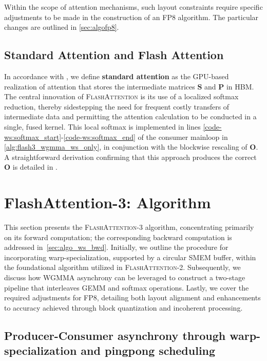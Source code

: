 Within the scope of attention mechanisms, such layout constraints require specific adjustments to be made in the construction of an FP8 algorithm. The particular changes are outlined in \cref{sec:algofp8}.

\subsection{Standard Attention and Flash Attention} In accordance with \citet{dao2022flashattention}, we define \textbf{standard attention} as the GPU-based realization of attention that stores the intermediate matrices $\mathbf{S}$ and $\mathbf{P}$ in HBM. The central innovation of \textsc{FlashAttention} is its use of a localized softmax reduction, thereby sidestepping the need for frequent costly transfers of intermediate data and permitting the attention calculation to be conducted in a single, fused kernel. This local softmax is implemented in lines \ref{code-ws:softmax_start}-\ref{code-ws:softmax_end} of the consumer mainloop in \cref{alg:flash3_wgmma_ws_only}, in conjunction with the blockwise rescaling of $\mathbf{O}$. A straightforward derivation confirming that this approach produces the correct $\mathbf{O}$ is detailed in \cite[\S 2.3.1]{dao2023flashattention2}.

\section{FlashAttention-3: Algorithm}
\label{sec:algo}

This section presents the \textsc{FlashAttention-3} algorithm, concentrating primarily on its forward computation; the corresponding backward computation is addressed in~\cref{sec:algo_ws_bwd}. Initially, we outline the procedure for incorporating warp-specialization, supported by a circular SMEM buffer, within the foundational algorithm utilized in \textsc{FlashAttention-2}. Subsequently, we discuss how WGMMA asynchrony can be leveraged to construct a two-stage pipeline that interleaves GEMM and softmax operations. Lastly, we cover the required adjustments for FP8, detailing both layout alignment and enhancements to accuracy achieved through block quantization and incoherent processing.

\subsection{Producer-Consumer asynchrony through warp-specialization and pingpong scheduling}
\label{sec:algo_ws}

